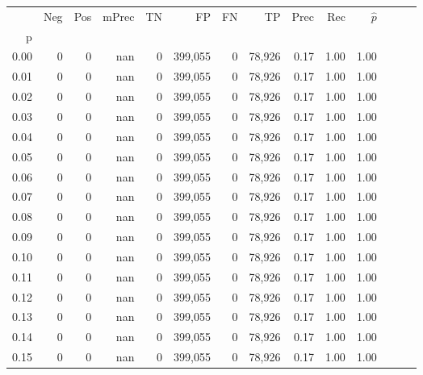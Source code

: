 \begin{tabular}{rrrrrrrrrrrrrr}
\toprule
{} &     Neg &     Pos & mPrec &       TN &       FP &      FN &      TP &  Prec &   Rec & $\hat{p}$ \\
p    &         &         &       &          &          &         &         &       &       &           \\
\midrule
0.00 &       0 &       0 &   nan &        0 &  399,055 &       0 &  78,926 &  0.17 &  1.00 &      1.00 \\
0.01 &       0 &       0 &   nan &        0 &  399,055 &       0 &  78,926 &  0.17 &  1.00 &      1.00 \\
0.02 &       0 &       0 &   nan &        0 &  399,055 &       0 &  78,926 &  0.17 &  1.00 &      1.00 \\
0.03 &       0 &       0 &   nan &        0 &  399,055 &       0 &  78,926 &  0.17 &  1.00 &      1.00 \\
0.04 &       0 &       0 &   nan &        0 &  399,055 &       0 &  78,926 &  0.17 &  1.00 &      1.00 \\
0.05 &       0 &       0 &   nan &        0 &  399,055 &       0 &  78,926 &  0.17 &  1.00 &      1.00 \\
0.06 &       0 &       0 &   nan &        0 &  399,055 &       0 &  78,926 &  0.17 &  1.00 &      1.00 \\
0.07 &       0 &       0 &   nan &        0 &  399,055 &       0 &  78,926 &  0.17 &  1.00 &      1.00 \\
0.08 &       0 &       0 &   nan &        0 &  399,055 &       0 &  78,926 &  0.17 &  1.00 &      1.00 \\
0.09 &       0 &       0 &   nan &        0 &  399,055 &       0 &  78,926 &  0.17 &  1.00 &      1.00 \\
0.10 &       0 &       0 &   nan &        0 &  399,055 &       0 &  78,926 &  0.17 &  1.00 &      1.00 \\
0.11 &       0 &       0 &   nan &        0 &  399,055 &       0 &  78,926 &  0.17 &  1.00 &      1.00 \\
0.12 &       0 &       0 &   nan &        0 &  399,055 &       0 &  78,926 &  0.17 &  1.00 &      1.00 \\
0.13 &       0 &       0 &   nan &        0 &  399,055 &       0 &  78,926 &  0.17 &  1.00 &      1.00 \\
0.14 &       0 &       0 &   nan &        0 &  399,055 &       0 &  78,926 &  0.17 &  1.00 &      1.00 \\
0.15 &       0 &       0 &   nan &        0 &  399,055 &       0 &  78,926 &  0.17 &  1.00 &      1.00 \\

\end{tabular}
